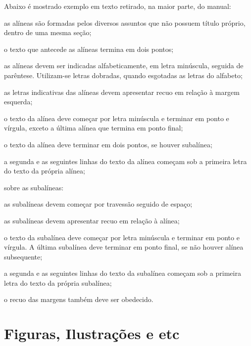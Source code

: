 Abaixo é mostrado exemplo em texto retirado, na maior parte, do manual:
\begin{alineas}
	\item as alíneas são formadas pelos diversos assuntos que não possuem título próprio, dentro de uma mesma seção;
	\item o texto que antecede as alíneas termina em dois pontos;
	\item as alíneas devem ser indicadas alfabeticamente, em letra minúscula, seguida de parêntese. Utilizam-se letras dobradas, quando esgotadas as letras do alfabeto;
	\item as letras indicativas das alíneas devem apresentar recuo em relação à margem esquerda;
	\item o texto da alínea deve começar por letra minúscula e terminar em ponto e vírgula, exceto a última alínea que termina em ponto final;
	\item o texto da alínea deve terminar em dois pontos, se houver subalínea;
	\item a segunda e as seguintes linhas do texto da alínea começam sob a primeira letra do texto da própria alínea;
	\item sobre as subalíneas:
	\begin{alineas}
		\item as subalíneas devem começar por travessão seguido de espaço;
		\item as subalíneas devem apresentar recuo em relação à alínea;
		\item o texto da subalínea deve começar por letra minúscula e terminar em ponto e vírgula. A última subalínea deve terminar em ponto final, se não houver alínea subsequente;
		\item a segunda e as seguintes linhas do texto da subalínea começam sob a primeira letra do texto da própria subalínea;
		\item o recuo das margens também deve ser obedecido.
	\end{alineas}
\end{alineas}


\section{Figuras, Ilustrações e etc}

